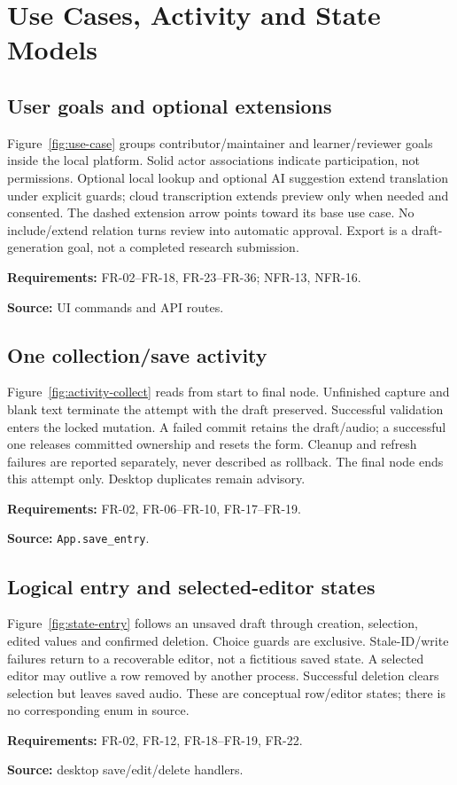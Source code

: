 \documentclass[11pt,a4paper]{article}
\newcommand{\viewtrace}[2]{\par\smallskip\noindent\textbf{Requirements:} #1.\par
  \noindent\textbf{Source:} #2.\par\medskip}
\begin{document}
\section{Use Cases, Activity and State Models}
\subsection{User goals and optional extensions}
Figure~\ref{fig:use-case} groups contributor/maintainer and learner/reviewer
goals inside the local platform. Solid actor associations indicate participation,
not permissions. Optional local lookup and optional AI suggestion extend
translation under explicit guards; cloud transcription extends preview only
when needed and consented. The dashed extension arrow points toward its base
use case. No include/extend relation turns review into automatic approval.
Export is a draft-generation goal, not a completed research submission.
\viewtrace{FR-02--FR-18, FR-23--FR-36; NFR-13, NFR-16}{UI commands and API routes}

\subsection{One collection/save activity}
Figure~\ref{fig:activity-collect} reads from start to final node. Unfinished
capture and blank text terminate the attempt with the draft preserved.
Successful validation enters the locked mutation. A failed commit retains the
draft/audio; a successful one releases committed ownership and resets the form.
Cleanup and refresh failures are reported separately, never described as rollback.
The final node ends this attempt only. Desktop duplicates remain advisory.
\viewtrace{FR-02, FR-06--FR-10, FR-17--FR-19}{\nolinkurl{App.save_entry}}

\subsection{Logical entry and selected-editor states}
Figure~\ref{fig:state-entry} follows an unsaved draft through creation,
selection, edited values and confirmed deletion. Choice guards are exclusive.
Stale-ID/write failures return to a recoverable editor, not a fictitious saved
state. A selected editor may outlive a row removed by another process.
Successful deletion clears selection but leaves saved audio. These are
conceptual row/editor states; there is no corresponding enum in source.
\viewtrace{FR-02, FR-12, FR-18--FR-19, FR-22}{desktop save/edit/delete handlers}
\end{document}
